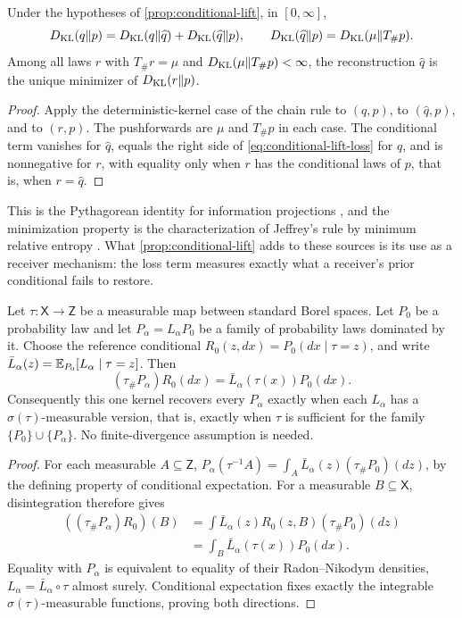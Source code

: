 Under the hypotheses of \cref{prop:conditional-lift}, in $[0,\infty]$,
\begin{equation}
D_{\mathrm{KL}}(q\Vert p)=D_{\mathrm{KL}}(q\Vert\widehat q)+D_{\mathrm{KL}}(\widehat q\Vert p),
\qquad
D_{\mathrm{KL}}(\widehat q\Vert p)=D_{\mathrm{KL}}(\mu\Vert T_\#p).
\label{eq:pythagorean}
\end{equation}
Among all laws $r$ with $T_\#r=\mu$ and $D_{\mathrm{KL}}(\mu\Vert T_\#p)<\infty$, the reconstruction $\widehat q$ is the unique minimizer of $D_{\mathrm{KL}}(r\Vert p)$.
\begin{proof}
Apply the deterministic-kernel case of the chain rule to $(q,p)$, to $(\widehat q,p)$, and to $(r,p)$. The pushforwards are $\mu$ and $T_\#p$ in each case. The conditional term vanishes for $\widehat q$, equals the right side of \cref{eq:conditional-lift-loss} for $q$, and is nonnegative for $r$, with equality only when $r$ has the conditional laws of $p$, that is, when $r=\widehat q$.
\end{proof}

This is the Pythagorean identity for information projections \citep{Csiszar1975}, and the minimization property is the characterization of Jeffrey's rule by minimum relative entropy \citep{DiaconisZabell1982}. What \cref{prop:conditional-lift} adds to these sources is its use as a receiver mechanism: the loss term measures exactly what a receiver's prior conditional fails to restore.

Let $\tau:\mathsf X\to\mathsf Z$ be a measurable map between standard Borel
spaces. Let $P_0$ be a probability law and let
$P_\alpha=L_\alpha P_0$ be a family of probability laws dominated by it.
Choose the reference conditional
$R_0(z,dx)=P_0(dx\mid \tau=z)$, and write
$\bar L_\alpha(z)=\mathbb E_{P_0}[L_\alpha\mid \tau=z]$. Then
\begin{equation}
 (\tau_\#P_\alpha)R_0(dx)
 =\bar L_\alpha(\tau(x))P_0(dx).
 \label{eq:common-family-density}
\end{equation}
Consequently this one kernel recovers every $P_\alpha$ exactly when each
$L_\alpha$ has a $\sigma(\tau)$-measurable version, that is, exactly when $\tau$
is sufficient for the family $\{P_0\}\cup\{P_\alpha\}$. No finite-divergence
assumption is needed.
\begin{proof}
For each measurable $A\subseteq\mathsf Z$,
$P_\alpha(\tau^{-1}A)=\int_A\bar L_\alpha(z)(\tau_\#P_0)(dz)$, by the defining
property of conditional expectation. For a measurable
$B\subseteq\mathsf X$, disintegration therefore gives
\begin{equation}
 \begin{aligned}
 ((\tau_\#P_\alpha)R_0)(B)
 &=\int\bar L_\alpha(z)R_0(z,B)(\tau_\#P_0)(dz)\\
 &=\int_B\bar L_\alpha(\tau(x))P_0(dx).
 \end{aligned}
\end{equation}
Equality with $P_\alpha$ is equivalent to equality of their
Radon--Nikodym densities,
$L_\alpha=\bar L_\alpha\circ \tau$ almost surely. Conditional expectation
fixes exactly the integrable $\sigma(\tau)$-measurable functions, proving
both directions.
\end{proof}

